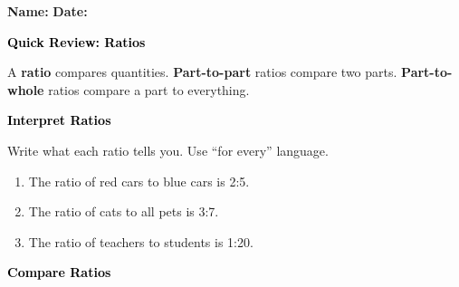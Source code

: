 \documentclass[12pt, letterpaper, fleqn]{article}
\begin{document}
\textbf{Name:} \underline{\hspace{5cm}}
\hfill
\textbf{Date:} \underline{\hspace{3cm}}\\

\begin{tcolorbox}[colback=customteal!20]
    \large\textcolor{black}{\textbf{Quick Review: Ratios}}
\end{tcolorbox}

\vspace{3mm}

\noindent
A \textbf{ratio} compares quantities. \textbf{Part-to-part} ratios compare two parts. \textbf{Part-to-whole} ratios compare a part to everything.

\vspace{4mm}

\begin{tcolorbox}[colback=customteal!20]
\large\textcolor{black}{\textbf{Interpret Ratios}}
\end{tcolorbox}

\noindent
Write what each ratio tells you. Use ``for every'' language.

\vspace{3mm}

\begin{enumerate}[itemsep=1.3cm, leftmargin=0.6cm]

\item The ratio of red cars to blue cars is 2:5.

\vspace{1.2cm}

\item The ratio of cats to all pets is 3:7.

\vspace{1.2cm}

\item The ratio of teachers to students is 1:20.

\vspace{1.2cm}

\end{enumerate}

\newpage

\begin{tcolorbox}[colback=customteal!20]
\large\textcolor{black}{\textbf{Compare Ratios}}
\end{tcolorbox}
\end{document}
